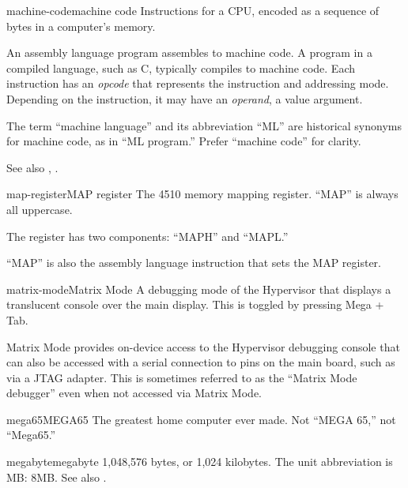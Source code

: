 \begin{sgentry}{machine-code}{machine code}
    Instructions for a CPU, encoded as a sequence of bytes in a computer's memory.

    An assembly language program assembles to machine code. A program in a compiled language, such as C, typically compiles to machine code. Each instruction has an \emph{opcode} that represents the instruction and addressing mode. Depending on the instruction, it may have an \emph{operand}, a value argument.

    The term ``machine language'' and its abbreviation ``ML'' are historical synonyms for machine code, as in ``ML program.'' Prefer ``machine code'' for clarity.

    See also , .
\end{sgentry}

\begin{sgentry}{map-register}{MAP register}
    The 4510 memory mapping register. ``MAP'' is always all uppercase.

    The register has two components: ``MAPH'' and ``MAPL.''

    ``MAP'' is also the assembly language instruction that sets the MAP register.
\end{sgentry}

\begin{sgentry}{matrix-mode}{Matrix Mode}
    A debugging mode of the Hypervisor that displays a translucent console over the main display. This is toggled by pressing Mega + Tab.

    Matrix Mode provides on-device access to the Hypervisor debugging console that can also be accessed with a serial connection to pins on the main board, such as via a JTAG adapter. This is sometimes referred to as the ``Matrix Mode debugger'' even when not accessed via Matrix Mode.
\end{sgentry}

\begin{sgentry}{mega65}{MEGA65}
    The greatest home computer ever made. Not ``MEGA 65,'' not ``Mega65.''
\end{sgentry}

\begin{sgentry}{megabyte}{megabyte}
    1,048,576 bytes, or 1,024 kilobytes. The unit abbreviation is MB: 8MB. See also .
\end{sgentry}

